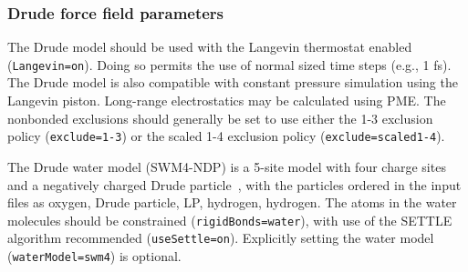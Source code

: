 \subsubsection{Drude force field parameters}

The Drude model should be used with the Langevin thermostat enabled
({\tt Langevin=on}).  
Doing so permits the use of normal sized time steps (e.g., 1 fs).  
The Drude model is also compatible with constant pressure simulation 
using the Langevin piston.  
Long-range electrostatics may be calculated using PME.  
The nonbonded exclusions should generally be set to use either the
1-3 exclusion policy ({\tt exclude=1-3})
or the scaled 1-4 exclusion policy ({\tt exclude=scaled1-4}).  

The Drude water model (SWM4-NDP) is a 5-site model
with four charge sites and 
a negatively charged Drude particle~\cite{Lamoureux-2006a}, 
with the particles ordered in the input files as 
oxygen, Drude particle, LP, hydrogen, hydrogen.  
The atoms in the water molecules should be 
constrained ({\tt rigidBonds=water}),
with use of the SETTLE algorithm recommended ({\tt useSettle=on}).  
Explicitly setting the water model ({\tt waterModel=swm4}) is optional.  

